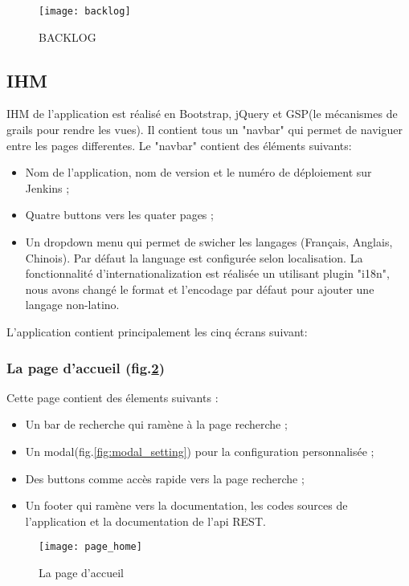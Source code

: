 \begin{figure}[ht]
 \centering
 \texttt{[image: backlog]}
 \caption{BACKLOG}
 \label{fig:backlog}
\end{figure}

\subsection{IHM}
IHM de l'application est réalisé en Bootstrap, jQuery et GSP(le mécanismes de grails pour rendre les vues).
Il contient tous un "navbar" qui permet de naviguer entre les pages differentes.
Le "navbar" contient des éléments suivants:
\begin{itemize}
 \item Nom de l'application, nom de version et le numéro de déploiement sur Jenkins ;
 \item Quatre buttons vers les quater pages ;
 \item Un dropdown menu qui permet de swicher les langages (Français, Anglais, Chinois).
       Par défaut la language est configurée selon localisation.
       La fonctionnalité d'internationalization est réalisée un utilisant plugin "i18n",
       nous avons changé le format et l'encodage par défaut pour ajouter une langage non-latino.
\end{itemize}

L'application contient principalement les cinq écrans suivant:

\subsubsection{La page d'accueil (fig.\ref{fig:page_home})}
Cette page contient des élements suivants :
\begin{itemize}
 \item Un bar de recherche qui ramène à la page recherche ;
 \item Un modal(fig.\ref{fig:modal_setting}) pour la configuration personnalisée ;
 \item Des buttons comme accès rapide vers la page recherche ;
 \item Un footer qui ramène vers la documentation, les codes sources de l'application et la documentation de l'api REST.
\end{itemize}

\begin{figure}[ht]
 \centering
 \texttt{[image: page\_home]}
 \caption{La page d'accueil}
 \label{fig:page_home}
\end{figure}

